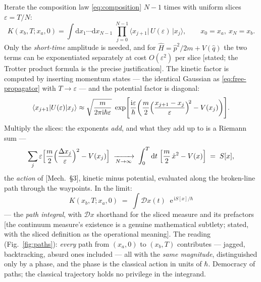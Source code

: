\documentclass[11pt]{article}
\theoremstyle{plain}
\theoremstyle{definition}
\theoremstyle{remark}
\newcommand{\dd}{\mathrm{d}}
\newcommand{\ee}{\mathrm{e}}
\newcommand{\ii}{\mathrm{i}}
\newcommand{\op}[1]{\hat{#1}}
\newcommand{\ket}[1]{\lvert #1 \rangle}
\newcommand{\bra}[1]{\langle #1 \rvert}
\begin{document}
Iterate the composition law \eqref{eq:composition} $N - 1$ times
with uniform slices $\varepsilon = T/N$:
\begin{equation}
  K(x_b, T; x_a, 0)
  = \int \dd x_1 \cdots \dd x_{N-1}\;
    \prod_{j=0}^{N-1}
    \bra{x_{j+1}}\,U(\varepsilon)\,\ket{x_j},
  \qquad x_0 = x_a,\ x_N = x_b .
\end{equation}
Only the \emph{short-time} amplitude is needed, and for
$\op H = \op p^2/2m + V(\op q)$ the two terms can be exponentiated
separately at cost $O(\varepsilon^2)$ per slice [stated; the Trotter
product formula is the precise justification]. The kinetic factor is
computed by inserting momentum states --- the identical Gaussian as
\eqref{eq:free-propagator} with $T \to \varepsilon$ --- and the
potential factor is diagonal:
\begin{equation}
  \bra{x_{j+1}} U(\varepsilon)\ket{x_j}
  \approx
  \sqrt{\frac{m}{2\pi\ii\hbar\varepsilon}}\;
  \exp\Biggl[
    \frac{\ii\varepsilon}{\hbar}
    \biggl(
      \frac m2
      \Bigl(\frac{x_{j+1} - x_j}{\varepsilon}\Bigr)^{\!2}
      - V(x_j)
    \biggr)
  \Biggr].
\end{equation}
Multiply the slices: the exponents \emph{add}, and what they add up
to is a Riemann sum ---
\begin{equation}
  \sum_{j}\varepsilon
  \Bigl[
    \frac m2\Bigl(\frac{\Delta x_j}{\varepsilon}\Bigr)^2
    - V(x_j)
  \Bigr]
  \;\xrightarrow[N \to \infty]{}\;
  \int_0^T \dd t\;
  \Bigl[\frac m2\,\dot x^2 - V(x)\Bigr]
  \;=\; S[x] ,
\end{equation}
the \emph{action} of [Mech.\ \S3], kinetic minus potential,
evaluated along the broken-line path through the waypoints. In the
limit:
\begin{equation}
  \boxed{\;
  K(x_b, T; x_a, 0)
  \;=\;
  \int\!\mathcal D x(t)\;\;
  \ee^{\,\ii S[x]/\hbar}
  \;}
  \label{eq:path-integral}
\end{equation}
--- the \emph{path integral}, with $\mathcal Dx$ shorthand for the
sliced measure and its prefactors [the continuum measure's
existence is a genuine mathematical subtlety; stated, with the
sliced definition as the operational meaning]. The reading
(Fig.~\ref{fig:paths}): \emph{every} path from $(x_a, 0)$ to
$(x_b, T)$ contributes --- jagged, backtracking, absurd ones
included --- all with the \emph{same magnitude}, distinguished only
by a phase, and the phase is the classical action in units of
$\hbar$. Democracy of paths; the classical trajectory holds no
privilege in the integrand.
\end{document}
